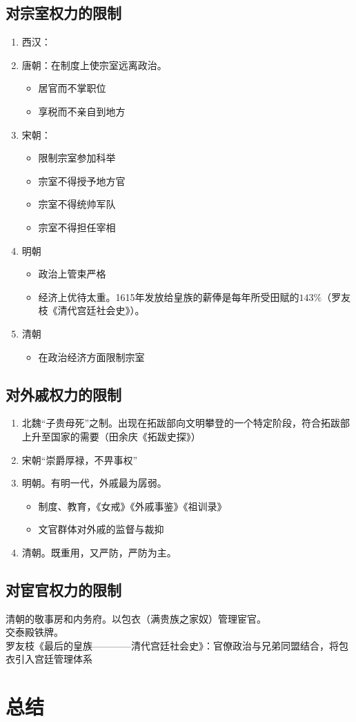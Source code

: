 \documentclass[twoside]{article}
\begin{document}
\subsection{对宗室权力的限制}
\begin{enumerate}
  \item 西汉：
  \item 唐朝：在制度上使宗室远离政治。
    \begin{itemize}
      \item 居官而不掌职位
      \item 享税而不亲自到地方
    \end{itemize}
  \item 宋朝：
    \begin{itemize}
      \item 限制宗室参加科举
      \item 宗室不得授予地方官
      \item 宗室不得统帅军队
      \item 宗室不得担任宰相
    \end{itemize}
  \item 明朝
    \begin{itemize}
      \item 政治上管束严格
      \item 经济上优待太重。1615年发放给皇族的薪俸是每年所受田赋的$143\%$（罗友枝《清代宫廷社会史》）。
    \end{itemize}
  \item 清朝
    \begin{itemize}
      \item 在政治经济方面限制宗室
    \end{itemize}
\end{enumerate}
\subsection{对外戚权力的限制}
\begin{enumerate}
  \item 北魏``子贵母死''之制。出现在拓跋部向文明攀登的一个特定阶段，符合拓跋部上升至国家的需要（田余庆《拓跋史探》）
  \item 宋朝``崇爵厚禄，不畀事权''
  \item 明朝。有明一代，外戚最为孱弱。
    \begin{itemize}
      \item 制度、教育，《女戒》《外戚事鉴》《祖训录》
      \item 文官群体对外戚的监督与裁抑
    \end{itemize}
  \item 清朝。既重用，又严防，严防为主。
\end{enumerate}
\subsection{对宦官权力的限制}
清朝的敬事房和内务府。以包衣（满贵族之家奴）管理宦官。\\
交泰殿铁牌。\\
罗友枝《最后的皇族————清代宫廷社会史》：官僚政治与兄弟同盟结合，将包衣引入宫廷管理体系
\section{总结}
\end{document}
